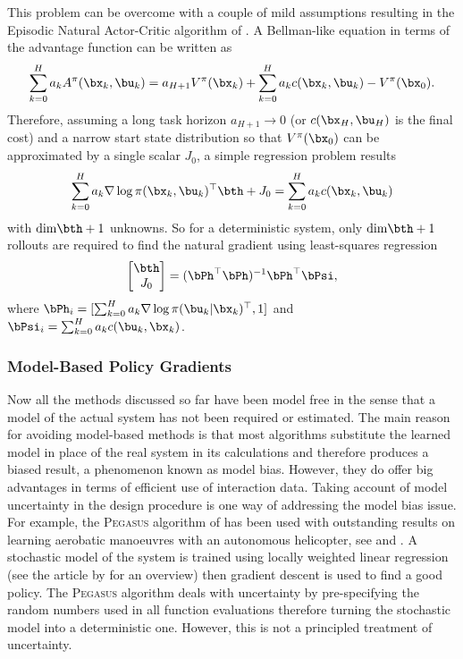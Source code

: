 This problem can be overcome with a couple of mild assumptions resulting in the Episodic Natural Actor-Critic algorithm of \cite{PVS05}. A Bellman-like equation in terms of the advantage function can be written as
\begin{equation}
\sum_{k=0}^H a_k A^\pi(\bx_k,\bu_k) = a_{H+1}V^\pi(\bx_k) + \sum_{k=0}^H a_k c(\bx_k,\bu_k) - V^\pi(\bx_0).
\end{equation}
Therefore, assuming a long task horizon $a_{H+1} \rightarrow 0$ (or $c(\bx_H,\bu_H)$ is the final cost) and a narrow start state distribution so that $V^\pi(\bx_0)$ can be approximated by a single scalar $J_0$, a simple regression problem results
\begin{equation}
\sum_{k=0}^H a_k \nabla\log\pi(\bx_k,\bu_k)^\top \bth + J_0 = \sum_{k=0}^H a_k c(\bx_k,\bu_k)
\end{equation}
with $\mathrm{dim}\bth +1$ unknowns. So for a deterministic system, only $\mathrm{dim}\bth +1$ rollouts are required to find the natural gradient using least-squares regression
\begin{equation}
\begin{bmatrix}\bth \\ J_0 \end{bmatrix} = (\bPh^\top \bPh)^{-1} \bPh^\top\bPsi,
\end{equation}
where $\bPh_i = [\sum_{k=0}^H a_k \nabla\log\pi(\bu_k|\bx_k)^\top,1]$ and $\bPsi_i = \sum_{k=0}^H a_kc(\bu_k,\bx_k)$.




\subsubsection{Model-Based Policy Gradients}
Now all the methods discussed so far have been model free in the sense that a model of the actual system has not been required or estimated. The main reason for avoiding model-based methods is that most algorithms substitute the learned model in place of the real system in its calculations and therefore produces a biased result, a phenomenon known as model bias. However, they do offer big advantages in terms of efficient use of interaction data. Taking account of model uncertainty in the design procedure is one way of addressing the model bias issue. For example, the \textsc{Pegasus} algorithm of \cite{NJ00} has been used with outstanding results on learning aerobatic manoeuvres with an autonomous helicopter, see \cite{NKJS04} and \cite{NCDG04}. A stochastic model of the system is trained using locally weighted linear regression (see the article by \cite{TVS10} for an overview) then gradient descent is used to find a good policy. The \textsc{Pegasus} algorithm deals with uncertainty by pre-specifying the random numbers used in all function evaluations therefore turning the stochastic model into a deterministic one. However, this is not a principled treatment of uncertainty.

